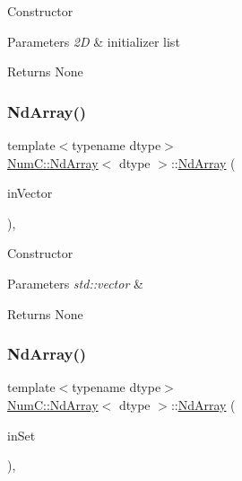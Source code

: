 Constructor


\begin{DoxyParams}{Parameters}
{\em 2D} & initializer list \\
\hline
\end{DoxyParams}
\begin{DoxyReturn}{Returns}
None 
\end{DoxyReturn}
\mbox{\label{class_num_c_1_1_nd_array_a57378e996158f31c5be873eca046109c}} 
\subsubsection{\texorpdfstring{Nd\+Array()}{NdArray()}\hspace{0.1cm}{\footnotesize\ttfamily [7/12]}}
{\footnotesize\ttfamily template$<$typename dtype$>$ \\
\mbox{\hyperlink{class_num_c_1_1_nd_array}{Num\+C\+::\+Nd\+Array}}$<$ dtype $>$\+::\mbox{\hyperlink{class_num_c_1_1_nd_array}{Nd\+Array}} (\begin{DoxyParamCaption}\item[{const std\+::vector$<$ dtype $>$ \&}]{in\+Vector }\end{DoxyParamCaption})\hspace{0.3cm}{\ttfamily [inline]}, {\ttfamily [explicit]}}

Constructor


\begin{DoxyParams}{Parameters}
{\em std\+::vector} & \\
\hline
\end{DoxyParams}
\begin{DoxyReturn}{Returns}
None 
\end{DoxyReturn}
\mbox{\label{class_num_c_1_1_nd_array_acbe7b33c1cea9849ea292e91becd833b}} 
\subsubsection{\texorpdfstring{Nd\+Array()}{NdArray()}\hspace{0.1cm}{\footnotesize\ttfamily [8/12]}}
{\footnotesize\ttfamily template$<$typename dtype$>$ \\
\mbox{\hyperlink{class_num_c_1_1_nd_array}{Num\+C\+::\+Nd\+Array}}$<$ dtype $>$\+::\mbox{\hyperlink{class_num_c_1_1_nd_array}{Nd\+Array}} (\begin{DoxyParamCaption}\item[{const std\+::set$<$ dtype $>$ \&}]{in\+Set }\end{DoxyParamCaption})\hspace{0.3cm}{\ttfamily [inline]}, {\ttfamily [explicit]}}

